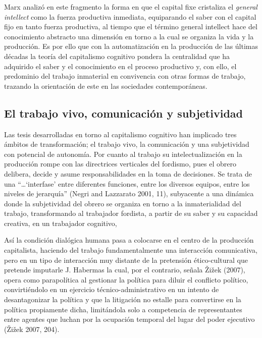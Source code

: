 \documentclass[
]{interact}
\begin{document}
Marx analizó en este fragmento la forma en que el capital fixe
cristaliza el \emph{general intellect} como la fuerza productiva
inmediata, equiparando el saber con el capital fijo en tanto fuerza
productiva, al tiempo que el término general intellect hace del
conocimiento abstracto una dimensión en torno a la cual se organiza la
vida y la producción. Es por ello que con la automatización en la
producción de las últimas décadas la teoría del capitalismo cognitivo
pondera la centralidad que ha adquirido el saber y el conocimiento en el
proceso productivo y, con ello, el predominio del trabajo inmaterial en
convivencia con otras formas de trabajo, trazando la orientación de este
en las sociedades contemporáneas.

\subsection{El trabajo vivo, comunicación y
subjetividad}\label{el-trabajo-vivo-comunicaciuxf3n-y-subjetividad}

Las tesis desarrolladas en torno al capitalismo cognitivo han implicado
tres ámbitos de transformación; el trabajo vivo, la comunicación y una
subjetividad con potencial de autonomía. Por cuanto al trabajo su
intelectualización en la producción rompe con las directrices verticales
del fordismo, pues el obrero delibera, decide y asume responsabilidades
en la toma de decisiones. Se trata de una ``\ldots{}`interfase' entre
diferentes funciones, entre los diversos equipos, entre los niveles de
jerarquía'' (Negri and Lazzarato 2001, 11), subyacente a una dinámica
donde la subjetividad del obrero se organiza en torno a la
inmaterialidad del trabajo, transformando al trabajador fordista, a
partir de su saber y su capacidad creativa, en un trabajador cognitivo,

Así la condición dialógica humana pasa a colocarse en el centro de la
producción capitalista, haciendo del trabajo fundamentalmente una
interacción comunicativa, pero en un tipo de interacción muy distante de
la pretensión ético-cultural que pretende imputarle J. Habermas la cual,
por el contrario, señala Žižek (2007), opera como parapolítica al
gestionar la política para diluir el conflicto político, convirtiéndolo
en un ejercicio técnico-administrativo en un intento de desantagonizar
la política y que la litigación no estalle para convertirse en la
política propiamente dicha, limitándola solo a competencia de
representantes entre agentes que luchan por la ocupación temporal del
lugar del poder ejecutivo (Žižek 2007, 204).
\end{document}
